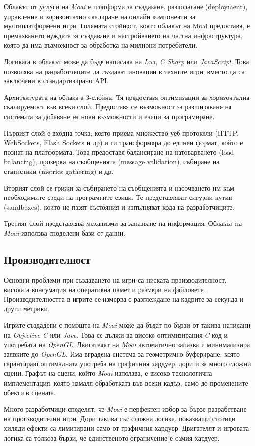 			Облакът от услуги на \emph{Moai} е платформа за създаване, разполагане (deployment), управление и 
			хоризонтално скалиране на онлайн компоненти за мултиплатформени игри. Голямата стойност, която облакът
			на Moai предоставя, е премахването нуждата за създаване и настройването на частна инфраструктура, която
			да има възможност за обработка на милиони потребители.
			
			Логиката в облакът може да бъде написана на \emph{Lua}, \emph{C Sharp} или \emph{JavaScript}.
			Това позволява на разработчиците да създават иновации в техните игри, вместо да са заключени
			в стандартизирано \ac{API}.
			
			Архитектурата на облака е 3-слойна. Тя предоставя оптимизации за хоризонтална скалируемост във
			всеки слой. Предоставя се възможност за разширяване на системата за добавяне на нови възможности
			и езици за програмиране.
			
			Първият слой е входна точка, която приема множество уеб протоколи (HTTP, WebSockets, Flash Sockets и др) и ги 
			трансформира до единен формат, който е познат на платформата. Това предоставя балансиране на натоварването (load balancing),
			проверка на съобщенията (message validation), събиране на статистики (metrics gathering) и др.
			
			Вторият слой се грижи за събирането на съобщенията и насочването им към необходимите среди на програмните езици.
			Те представляват сигурни кутии (sandboxes), които не пазят състояния и изпълняват кода на разработчиците.
			
			Третият слой представлява механизми за запазване на информация. Облакът на \emph{Moai} използва споделени
			бази от данни.
			
		\subsection{Производителност}
		
			Основни проблеми при създаването на игри са ниската производителност, високата консумация на оперативна памет
			и размери на файловете. Производителността в игрите се измерва с разглеждане на кадрите за секунда и други метрики.
			
			Игрите създадени с помощта на \emph{Moai} може да бъдат по-бързи от такива написани на \emph{Objective-C} или \emph{Java}.
			Това се дължи на високо оптимизирания \emph{C} код и употребата на \emph{OpenGL}. Двигателят на \emph{Moai} автоматично
			запазва и минимализира заявките до \emph{OpenGL}. Има вградена система за геометрично буфериране, която гарантираю
			оптималната употреба на графичния хардуер, дори и за много сложни сцени. Графът на сцени, който \emph{Moai} използва,
			е високо технологична имплементация, която намаля обработката във всеки кадър, само до променените обекти в сцената.
			
			Много разработчици споделят, че \emph{Moai} е перфектен избор за бързо разработване на производителни игри.
			Дори такива със сложна логика, показващи стотици хиляди ефекти са лимитирани само от графичния хардуер.
			Двигателят и игровата логика са толкова бързи, че единственото ограничение е самия хардуер. \cite{Zipline}
			
			